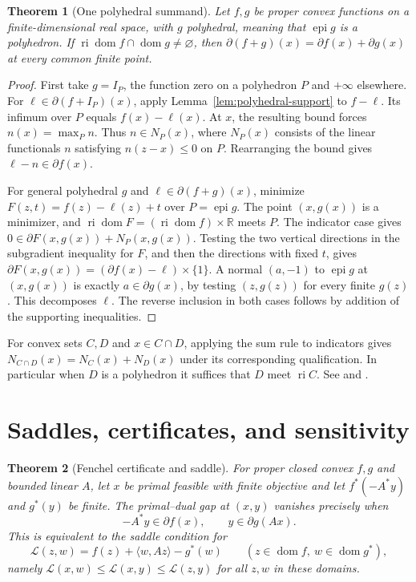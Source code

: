 \documentclass[11pt,oneside,openany]{book}
\newcommand{\R}{\mathbb R}
\theoremstyle{plain}
\newtheorem{theorem}{Theorem}[chapter]
\theoremstyle{definition}
\theoremstyle{remark}
\begin{document}
\begin{theorem}[One polyhedral summand]\label{thm:polyhedral-sum}
Let \(f,g\) be proper convex functions on a
finite-dimensional real space, with \(g\) polyhedral,
meaning that \(\operatorname{epi}g\) is a polyhedron.
If \(\operatorname{ri}\operatorname{dom}f\cap
\operatorname{dom}g\ne\varnothing\), then
\(\partial(f+g)(x)=\partial f(x)+\partial g(x)\)
at every common finite point.
\end{theorem}

\begin{proof}
First take \(g=I_P\), the function zero on a polyhedron
\(P\) and \(+\infty\) elsewhere. For \(\ell\in
\partial(f+I_P)(x)\), apply Lemma~\ref{lem:polyhedral-support}
to \(f-\ell\). Its infimum over \(P\) equals \(f(x)-\ell(x)\).
At \(x\), the resulting bound forces \(n(x)=\max_P n\).
Thus \(n\in N_P(x)\), where \(N_P(x)\) consists of the
linear functionals \(n\) satisfying \(n(z-x)\le0\) on \(P\).
Rearranging the bound gives \(\ell-n\in\partial f(x)\).

For general polyhedral \(g\) and
\(\ell\in\partial(f+g)(x)\), minimize
\(F(z,t)=f(z)-\ell(z)+t\) over
\(P=\operatorname{epi}g\). The point \((x,g(x))\)
is a minimizer, and \(\operatorname{ri}\operatorname{dom}F
=(\operatorname{ri}\operatorname{dom}f)\times\R\)
meets \(P\). The indicator case gives
\(0\in \partial F(x,g(x))+N_P(x,g(x))\).
Testing the two vertical directions in the subgradient
inequality for \(F\), and then the directions with
fixed \(t\), gives
\(\partial F(x,g(x))=(\partial f(x)-\ell)\times\{1\}\).
A normal \((a,-1)\) to \(\operatorname{epi}g\) at
\((x,g(x))\) is exactly \(a\in\partial g(x)\), by testing
\((z,g(z))\) for every finite \(g(z)\).
This decomposes \(\ell\). The reverse inclusion in
both cases follows by addition of the supporting inequalities.
\end{proof}

For convex sets \(C,D\) and \(x\in C\cap D\),
applying the sum rule to indicators gives
\(N_{C\cap D}(x)=N_C(x)+N_D(x)\) under its corresponding
qualification. In particular when \(D\) is a polyhedron
it suffices that \(D\) meet \(\operatorname{ri}C\).
See \cite[Theorems 23.8--23.9]{Rockafellar} and
\cite[Chapter I, Section 5]{EkelandTemam}.

\section{Saddles, certificates, and sensitivity}
\label{v04-05}

\begin{theorem}[Fenchel certificate and saddle]\label{thm:fenchel-saddle}
For proper closed convex \(f,g\) and bounded linear \(A\),
let \(x\) be primal feasible with finite objective and let
\(f^*(-A^*y)\) and \(g^*(y)\) be finite. The primal--dual gap
at \((x,y)\) vanishes precisely when
\[
 -A^*y\in\partial f(x),\qquad y\in\partial g(Ax).
\]
This is equivalent to the saddle condition for
\[
 \mathcal L(z,w)=f(z)+\langle w,Az\rangle-g^*(w)
 \qquad(z\in\operatorname{dom}f,\ w\in\operatorname{dom}g^*),
\]
namely \(\mathcal L(x,w)\le\mathcal L(x,y)
\le\mathcal L(z,y)\) for all \(z,w\) in these domains.
\end{theorem}
\end{document}
